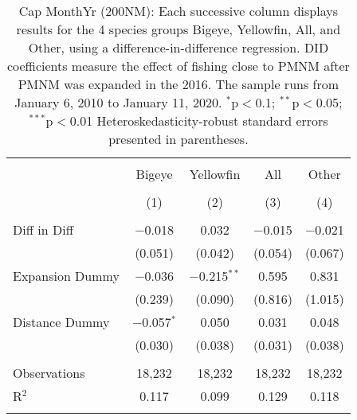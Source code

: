 
\begin{table}[!htbp] \centering 
  \caption{Cap MonthYr (200NM): Each successive column displays results for the 4 species groups Bigeye, Yellowfin, All, and Other, using a difference-in-difference regression. DID coefficients measure the effect of fishing close to PMNM after PMNM was expanded in the 2016. The sample runs from January 6, 2010 to January 11, 2020. $^{*}$p$<$0.1; $^{**}$p$<$0.05; $^{***}$p$<$0.01 Heteroskedasticity-robust standard errors presented in parentheses.} 
  \label{tbl:timeFE200NM} 
\begin{tabular}{@{\extracolsep{5pt}}lcccc} 
\\[-1.8ex]\hline 
\hline \\[-1.8ex] 
 & Bigeye & Yellowfin & All & Other \\ 
\\[-1.8ex] & (1) & (2) & (3) & (4)\\ 
\hline \\[-1.8ex] 
 Diff in Diff & $-$0.018 & 0.032 & $-$0.015 & $-$0.021 \\ 
  & (0.051) & (0.042) & (0.054) & (0.067) \\ 
  Expansion Dummy & $-$0.036 & $-$0.215$^{**}$ & 0.595 & 0.831 \\ 
  & (0.239) & (0.090) & (0.816) & (1.015) \\ 
  Distance Dummy & $-$0.057$^{*}$ & 0.050 & 0.031 & 0.048 \\ 
  & (0.030) & (0.038) & (0.031) & (0.038) \\ 
 \hline \\[-1.8ex] 
Observations & 18,232 & 18,232 & 18,232 & 18,232 \\ 
R$^{2}$ & 0.117 & 0.099 & 0.129 & 0.118 \\ 
\hline 
\hline \\[-1.8ex] 
\end{tabular} 
\end{table} 
